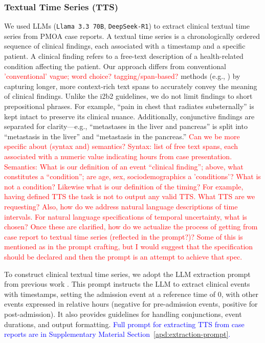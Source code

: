 \documentclass[pdflatex,sn-mathphys-num]{sn-jnl}%
\newcommand{\jeremy}[1]{\textcolor{red}{#1}}
\theoremstyle{thmstyleone}%
\theoremstyle{thmstyletwo}%
\theoremstyle{thmstylethree}%
\begin{document}
\subsubsection{Textual Time Series (TTS)}
\label{sec:textual-time-series}

We used LLMs (\texttt{Llama 3.3 70B}, \texttt{DeepSeek-R1}) to extract clinical textual time series from PMOA case reports. A textual time series is a chronologically ordered sequence of clinical findings, each associated with a timestamp and a specific patient. A clinical finding refers to a free-text description of a health-related condition affecting the patient. Our approach differs from conventional \jeremy{'conventional' vague; word choice? tagging/span-based?} methods (e.g., \cite{sun2013evaluating, uzuner20112010}) by capturing longer, more context-rich text spans to accurately convey the meaning of clinical findings. Unlike the i2b2 guidelines, we do not limit findings to short prepositional phrases. For example, ``pain in chest that radiates substernally'' is kept intact to preserve its clinical nuance. Additionally, conjunctive findings are separated for clarity—e.g., ``metastases in the liver and pancreas'' is split into ``metastasis in the liver'' and ``metastasis in the pancreas.'' \jeremy{Can we be more specific about (syntax and) semantics? Syntax: list of free text spans, each associated with a numeric value indicating hours from case presentation. Semantics: What is our definition of an event ``clinical finding''; above, what constitutes a ``condition''; are age, sex, sociodemographics a 'conditions'? What is not a condition? Likewise what is our definition of the timing? For example, having defined TTS the task is not to output any valid TTS. What TTS are we requesting? Also, how do we address natural language descriptions of time intervals. For natural language specifications of temporal uncertainty, what is chosen? Once these are clarified, how do we actualize the process of getting from case report to textual time series (reflected in the prompt?)? Some of this is mentioned as in the prompt crafting, but I would suggest that the specification should be declared and then the prompt is an attempt to achieve that spec.}

To construct clinical textual time series, we adopt the LLM extraction prompt from previous work \citep{wang2025large,noroozizadeh2025reconstructing}. This prompt instructs the LLM to extract clinical events with timestamps, setting the admission event at a reference time of 0, with other events expressed in relative hours (negative for pre-admission events, positive for post-admission). It also provides guidelines for handling conjunctions, event durations, and output formatting. \textcolor{blue}{Full prompt for extracting TTS from case reports are in Supplementary Material Section~\ref{apd:extraction-prompt}.}
\end{document}
